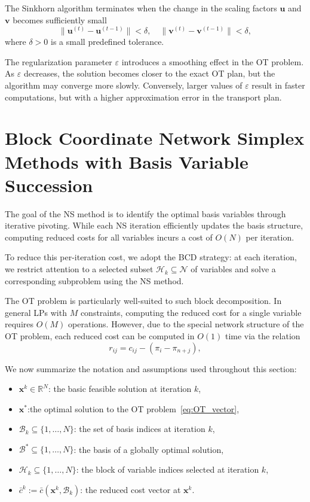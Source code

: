 \documentclass[12pt,a4paper]{article}
\begin{document}
\noindent
The Sinkhorn algorithm terminates when the change in the scaling factors \( \mathbf{u} \) and \( \mathbf{v} \) becomes sufficiently small
\[
\| \mathbf{u}^{(t)} - \mathbf{u}^{(t-1)} \| < \delta, \quad \| \mathbf{v}^{(t)} - \mathbf{v}^{(t-1)} \| < \delta,
\]
where \( \delta > 0 \) is a small predefined tolerance.

\noindent
The regularization parameter \( \varepsilon \) introduces a smoothing effect in the OT problem. As \( \varepsilon \) decreases, the solution becomes closer to the exact OT plan, but the algorithm may converge more slowly. Conversely, larger values of \( \varepsilon \) result in faster computations, but with a higher approximation error in the transport plan.



\section{Block Coordinate Network Simplex Methods with Basis Variable Succession}

The goal of the NS method is to identify the optimal basis variables through iterative pivoting. While each NS iteration efficiently updates the basis structure, computing reduced costs for all variables incurs a cost of \( O(N) \) per iteration.

To reduce this per-iteration cost, we adopt the BCD strategy: at each iteration, we restrict attention to a selected subset \(\mathcal{H}_k \subseteq \mathcal{N} \) of variables and solve a corresponding subproblem using the NS method. 

The OT problem is particularly well-suited to such block decomposition. In general LPs with \(M\) constraints, computing the reduced cost for a single variable requires \(O(M)\) operations. However, due to the special network structure of the OT problem, each reduced cost can be computed in \(O(1)\) time via the relation
\[
r_{ij} = c_{ij} - (\pi_i - \pi_{n + j}),
\]

\medskip
\noindent
We now summarize the notation and assumptions used throughout this section:
\begin{itemize}
    \item \( \mathbf{x}^k \in \mathbb{R}^N \): the basic feasible solution at iteration \(k\),
    \item \( \mathbf{x}^* \):the optimal solution to the OT problem~\eqref{eq:OT_vector},
    \item \( \mathcal{B}_k \subseteq \{1,\dots,N\} \): the set of basis indices at iteration \(k\),
    \item \( \mathcal{B}^\ast \subseteq \{1,\dots,N\} \): the basis of a globally optimal solution,
    \item \( \mathcal{H}_k \subseteq \{1,\dots,N\} \): the block of variable indices selected at iteration \(k\),
    \item \( \bar{c}^k := \bar{c}(\mathbf{x}^k, \mathcal{B}_k) \): the reduced cost vector at \( \mathbf{x}^k \).
\end{itemize}
\end{document}
